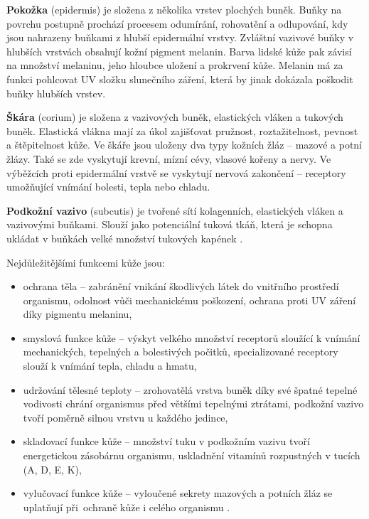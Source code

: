 \textbf{Pokožka} (epidermis) je složena z několika vrstev plochých buněk. Buňky na povrchu postupně prochází procesem odumírání, rohovatění a odlupování, kdy jsou nahrazeny buňkami z hlubší epidermální vrstvy. Zvláštní vazivové buňky v hlubších vrstvách obsahují kožní pigment melanin. Barva lidské kůže pak závisí na množství melaninu, jeho hloubce uložení a prokrvení kůže. Melanin má za funkci pohlcovat UV složku slunečního záření, která by jinak dokázala poškodit buňky hlubších vrstev.

\textbf{Škára} (corium) je složena z vazivových buněk, elastických vláken a tukových buněk. Elastická vlákna mají za úkol zajišťovat pružnost, roztažitelnost, pevnost a štěpitelnost kůže. Ve škáře jsou uloženy dva typy kožních žláz -- mazové a potní žlázy. Také se zde vyskytují krevní, mízní cévy, vlasové kořeny a nervy. Ve výběžcích proti epidermální vrstvě se vyskytují nervová zakončení -- receptory umožňující vnímání bolesti, tepla nebo chladu.

\textbf{Podkožní vazivo} (subcutis) je tvořené sítí kolagenních, elastických vláken a vazivovými buňkami. Slouží jako potenciální tuková tkáň, která je schopna ukládat v buňkách velké množství tukových kapének \cite{ZakladyFunkcniAnatomieCloveka}.

Nejdůležitějšími funkcemi kůže jsou:
\begin{itemize}
    \item ochrana těla -- zabránění vnikání škodlivých látek do vnitřního prostředí organismu, odolnost vůči mechanickému poškození, ochrana proti UV záření díky pigmentu melaninu,
    \item smyslová funkce kůže -- výskyt velkého množství receptorů sloužící k vnímání mechanických, tepelných a bolestivých počitků, specializované receptory slouží k vnímání tepla, chladu a hmatu,
    \item udržování tělesné teploty -- zrohovatělá vrstva buněk díky své špatné tepelné vodivosti chrání organismus před většími tepelnými ztrátami, podkožní vazivo tvoří poměrně silnou vrstvu u každého jedince,
    \item skladovací funkce kůže -- množství tuku v podkožním vazivu tvoří energetickou zásobárnu organismu, uskladnění vitamínů rozpustných v tucích (A, D, E, K),
    \item vylučovací funkce kůže -- vyloučené sekrety mazových a potních žláz se uplatňují při~ochraně kůže i celého organismu \cite{ZakladyFunkcniAnatomieCloveka}.
\end{itemize}


